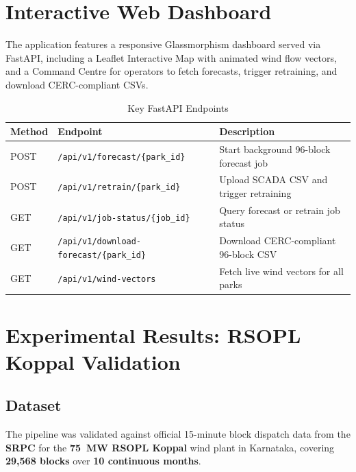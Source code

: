 \documentclass[12pt,a4paper]{report}
\begin{document}
\chapter{Interactive Web Dashboard}
\label{ch:dashboard}

The application features a responsive Glassmorphism dashboard served via FastAPI, including
a Leaflet Interactive Map with animated wind flow vectors, and a Command Centre for operators
to fetch forecasts, trigger retraining, and download CERC-compliant CSVs.

\begin{table}[H]
  \centering
  \caption{Key FastAPI Endpoints}
  \label{tab:api}
  \begin{tabularx}{\textwidth}{llX}
    \toprule
    \textbf{Method} & \textbf{Endpoint} & \textbf{Description} \\
    \midrule
    POST & \texttt{/api/v1/forecast/\{park\_id\}}          & Start background 96-block forecast job \\
    POST & \texttt{/api/v1/retrain/\{park\_id\}}           & Upload SCADA CSV and trigger retraining \\
    GET  & \texttt{/api/v1/job-status/\{job\_id\}}         & Query forecast or retrain job status \\
    GET  & \texttt{/api/v1/download-forecast/\{park\_id\}} & Download CERC-compliant 96-block CSV \\
    GET  & \texttt{/api/v1/wind-vectors}                   & Fetch live wind vectors for all parks \\
    \bottomrule
  \end{tabularx}
\end{table}

\chapter{Experimental Results: RSOPL Koppal Validation}
\label{ch:results}

\section{Dataset}

The pipeline was validated against official 15-minute block dispatch data from the
\textbf{SRPC} for the \textbf{75~MW RSOPL Koppal} wind plant in Karnataka,
covering \textbf{29,568 blocks} over \textbf{10 continuous months}.
\end{document}
